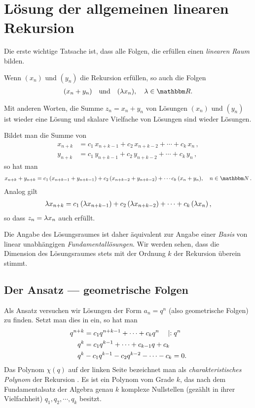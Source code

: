 \documentclass[11pt,a4paper]{article}
\begin{document}
\section{Lösung der allgemeinen linearen Rekursion \rf[e-linrek]}
Die erste wichtige Tatsache ist, dass alle Folgen, die \rf[e-linrek] erfüllen
einen \emph{linearen Raum} bilden.

\begin{satz} \label{s-1}
Wenn $(x_n)$ und $(y_n)$ die Rekursion \rf[e-linrek] erfüllen, so auch die
Folgen
\begin{gather*}
  (x_n + y_n) \quad\text{und}\quad (\lam x_n),\quad \lam\in\R.
\end{gather*}
\end{satz}

Mit anderen Worten, die Summe $z_n=x_n +y_n$ von Lösungen $(x_n) $ und $(y_n)$
ist wieder eine Lösung und skalare Vielfache von Lösungen sind wieder Lösungen.

\begin{beweis} Bildet man die Summe von
\begin{align*}
x_{n+k}& =c_1\, x_{n+k-1} +c_2\,x_{n+k-2} +\cdots + c_k\,x_n\,,\\
y_{n+k}&=c_1\, y_{n+k-1} +c_2\, y_{n+k-2} +\cdots + c_k\, y_n\,,
\end{align*}
so hat man
\begin{gather*}
  x_{n+k} +y_{n+k} = c_1\,(x_{n+k-1} +y_{n+k-1}) +c_2\, (x_{n+k-2} +y_{n+k-2})
  +\cdots c_k\,( x_n +y_n), \quad n\in \N\,.
\end{gather*}
Analog gilt
\begin{gather*}
  \lambda x_{n+k} =c_1\,(\lambda x_{n+k-1}) +c_2\,(\lambda x_{n+k-2}) +\cdots + c_k
  \,(\lambda x_n)\,,
\end{gather*}
so dass $z_n=\lambda x_n$ auch \rf[e-linrek] erfüllt.  

Die Angabe des Lösungsraumes ist daher äquivalent zur Angabe einer \emph{Basis}
von linear unabhängigen \emph{Fundamentallösungen}. Wir werden sehen, dass die
Dimension des Lösungsraumes stets mit der Ordnung $k$ der Rekursion überein
stimmt.
\end{beweis}

\subsection{Der Ansatz --- geometrische Folgen} Als Ansatz versuchen wir 
Lösungen der Form $a_n=q^{n}$ (also geometrische Folgen) zu finden.
Setzt man dies in \rf[e-linrek] ein, so hat man
\begin{align}
q^{n+k} &=c_1 q^{n+k-1} +\cdots + c_k q^n\quad \mid :q^n\label{e-char1} \\
q^k&= c_1q^{k-1} +\cdots +c_{k-1} q + c_k\nonumber\\
q^k&-c_1q^{k-1} -c_2 q^{k-2}- \cdots -c_k=0\label{e-char}.
\end{align}
Das Polynom $\chi(q) $ auf der linken Seite bezeichnet man als
\emph{charakteristisches Polynom} der Rekursion \rf[e-linrek]. Es ist ein
Polynom vom Grade $k$, das nach dem Fundamentalsatz der Algebra genau $k$
komplexe Nullstellen (gezählt in ihrer Vielfachheit) $q_1,q_2,\cdots ,q_k$
besitzt.
\end{document}
